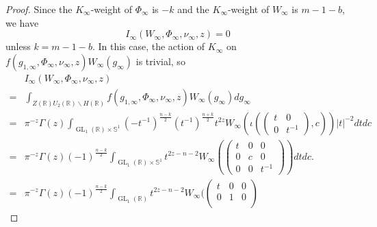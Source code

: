 \documentclass[10pt,a4paper]{amsart}
\DeclareMathOperator{\GL}{\mathrm{GL}}
\def\RR{\mathbb{R}}
\begin{document}
\begin{proof}
    \par Since the $K_{\infty}$-weight of $\Phi_{\infty}$ is $-k$ and the $K_{\infty}$-weight of $W_{\infty}$ is $m - 1 - b$, we have
    \begin{equation*}
        I_{\infty}(W_{\infty}, \Phi_{\infty}, \nu_{\infty}, z) = 0
    \end{equation*}
    unless $k = m - 1 -b$. In this case, the action of $K_{\infty}$ on $f(g_{1, \infty}, \Phi_{\infty}, \nu_{\infty}, z)W_{\infty}(g_{\infty})$ is trivial, so
    \begin{align}
        & I_{\infty}(W_{\infty}, \Phi_{\infty}, \nu_{\infty}, z) \\ = & \int_{Z(\RR)U_{2}(\RR) \backslash H(\RR)} f(g_{1, \infty}, \Phi_{\infty}, \nu_{\infty}, z) W_{\infty}(g_{\infty}) dg_{\infty} \\ 
        = & \pi^{-z}\Gamma(z) \int_{\GL_1(\RR) \times \mathbb{S}^{1}} (-t^{-1})^{\frac{n-k}{2}} (t^{-1})^{\frac{n+k}{2}} t^{2z} W_{\infty}(\iota( \begin{pmatrix}
            t & 0 \\
            0 & t^{-1} 
        \end{pmatrix}, c)) |t|^{-2} dt dc  \\
        = & \pi^{-z}\Gamma(z) (-1)^{\frac{n - k}{2}}  \int_{\GL_1(\RR) \times \mathbb{S}^{1}}t^{2z - n - 2} W_{\infty}( \begin{pmatrix}
                                                                                                                            t & 0 & 0 \\
                                                                                                                            0 & c & 0 \\
                                                                                                                            0 & 0 & t^{-1} 
                                                                                                                        \end{pmatrix}) dt dc. \\ 
        \label{eqn: Arch_Zeta_Int} = & \pi^{-z}\Gamma(z) (-1)^{\frac{n - k}{2}} \int_{\GL_1(\RR)} t^{2z - n - 2} W_{\infty}( \begin{pmatrix}
                                                                                                    t & 0 & 0 \\
                                                                                                    0 & 1 & 0 \\

\end{pmatrix}
\end{align}
\end{proof}
\end{document}
